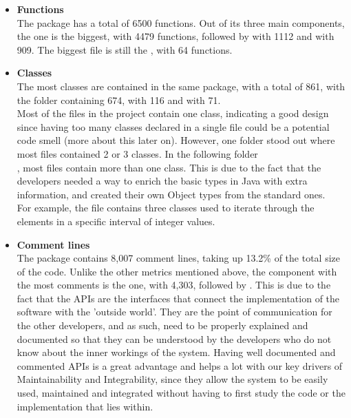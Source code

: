 \begin{itemize}
                \item \textbf{Functions}\\
                    The  package has a total of 6500 functions. Out of its three main components, the  one is the biggest, with 4479 functions, followed by  with 1112 and  with 909. The biggest file is still the , with 64 functions.
                \item \textbf{Classes}\\
                    The most classes are contained in the same package, with a total of 861, with the  folder containing 674,  with 116 and  with 71. \\
                    Most of the files in the project contain one class, indicating a good design since having too many classes declared in a single file could be a potential code smell (more about this later on). However, one folder stood out where most files contained 2 or 3 classes. In the following folder
                    \\ , most files contain more than one class. This is due to the fact that the developers needed a way to enrich the basic types in Java with extra information, and created their own Object types from the standard ones. 
                    \\ For example, the file  contains three classes used to iterate through the elements in a specific interval of integer values. 
                \item \textbf{Comment lines}\\
                    The  package contains 8,007 comment lines, taking up 13.2\% of the total size of the code. Unlike the other metrics mentioned above, the component with the most comments is the  one, with 4,303, followed by . This is due to the fact that the APIs are the interfaces that connect the implementation of the software with the 'outside world'. They are the point of communication for the other developers, and as such, need to be properly explained and documented so that they can be understood by the developers who do not know about the inner workings of the system. Having well documented and commented APIs is a great advantage and helps a lot with our key drivers of Maintainability and Integrability, since they allow the system to be easily used, maintained and integrated without having to first study the code or the implementation that lies within.
            \end{itemize}
